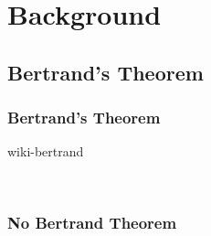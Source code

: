 % 

\section{Background}
\subsection{Bertrand's Theorem}

\begin{frame}\frametitle{Bertrand's Theorem}
\center
	\begin{overpic}[ scale = 0.3 ]
		{\pLocalGraphics wiki-bertrand}
	\end{overpic}%
	\\
\end{frame}

\begin{frame}\frametitle{No Bertrand Theorem}
\end{frame}

\endinput  %
